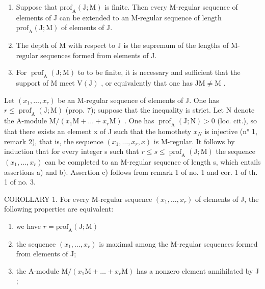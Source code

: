 \begin{enumerate}
\def\labelenumi{\alph{enumi})}
\item
  Suppose that \(\mathrm{prof}_{\mathrm{A}}(\mathrm{J};\mathrm{M})\) is finite. Then every M-regular sequence of elements of J can be extended to an M-regular sequence of length \(\mathrm{prof}_{\mathrm{A}}(\mathrm{J};\mathrm{M})\) of elements of J.
\item
  The depth of M with respect to J is the supremum of the lengths of M-regular sequences formed from elements of J.
\item
  For \(\operatorname{prof}_{\mathrm{A}}(\mathrm{J};\mathrm{M})\) to to be finite, it is necessary and sufficient that the support of M meet \(\mathrm{V}(\mathrm{J})\) , or equivalently that one has \(\mathrm{JM} \neq \mathrm{M}\) .
\end{enumerate}

Let \((x_{1},\ldots,x_{r})\) be an M-regular sequence of elements of J. One has \(r\leqslant\operatorname{prof}_{\mathrm{A}}(\mathrm{J};\mathrm{M})\) (prop. 7); suppose that the inequality is strict. Let N denote the A-module \(\mathrm{M}/(x_{1}\mathrm{M}+\ldots+x_{r}\mathrm{M})\) . One has \(\operatorname{prof}_{\mathrm{A}}(\mathrm{J};\mathrm{N})>0\) (loc. cit.), so that there exists an element x of J such that the homothety \(x_{N}\) is injective (n° 1, remark 2), that is, the sequence \((x_{1},\ldots,x_{r},x)\) is M-regular. It follows by induction that for every integer s such that \(r\leqslant s\leqslant\operatorname{prof}_{\mathrm{A}}(\mathrm{J};\mathrm{M})\) the sequence \((x_{1},\ldots,x_{r})\) can be completed to an M-regular sequence of length s, which entails assertions a) and b). Assertion c) follows from remark 1 of no. 1 and cor. 1 of th. 1 of no. 3.

COROLLARY 1. For every M-regular sequence \((x_{1},\ldots ,x_{r})\) of elements of J, the following properties are equivalent:

\begin{enumerate}
\def\labelenumi{(\roman{enumi})}
\item
  we have \(r = \mathrm{prof}_{\mathrm{A}}(\mathrm{J};\mathrm{M})\)
\item
  the sequence \((x_{1},\ldots,x_{r})\) is maximal among the M-regular sequences formed from elements of J;
\item
  the A-module \(\mathrm{M}/(x_{1}\mathrm{M}+\ldots+x_{r}\mathrm{M})\) has a nonzero element annihilated by J ;
\end{enumerate}

